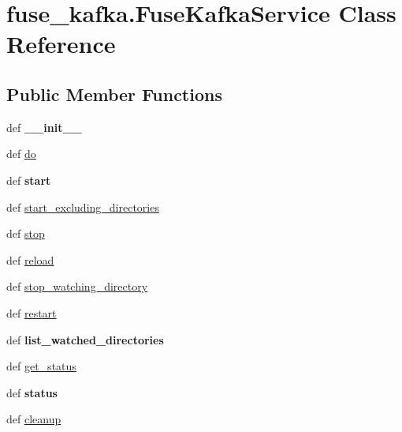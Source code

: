 \hypertarget{classfuse__kafka_1_1FuseKafkaService}{\section{fuse\-\_\-kafka.\-Fuse\-Kafka\-Service \-Class \-Reference}
\label{classfuse__kafka_1_1FuseKafkaService}
}
\subsection*{\-Public \-Member \-Functions}
\begin{DoxyCompactItemize}
\item 
\hypertarget{classfuse__kafka_1_1FuseKafkaService_a0bd77704cc258a800441426e62452195}{def {\bfseries \-\_\-\-\_\-init\-\_\-\-\_\-}}\label{classfuse__kafka_1_1FuseKafkaService_a0bd77704cc258a800441426e62452195}

\item 
def \hyperlink{classfuse__kafka_1_1FuseKafkaService_a08ccfab12ff2c998f5bc466de9c9afa4}{do}
\item 
\hypertarget{classfuse__kafka_1_1FuseKafkaService_a2d8e0d317d293fa8f932e3e8882549f5}{def {\bfseries start}}\label{classfuse__kafka_1_1FuseKafkaService_a2d8e0d317d293fa8f932e3e8882549f5}

\item 
def \hyperlink{classfuse__kafka_1_1FuseKafkaService_a8a8b5dd68c2c1dbd9315ac2ea4bd5219}{start\-\_\-excluding\-\_\-directories}
\item 
def \hyperlink{classfuse__kafka_1_1FuseKafkaService_ad17bb7d3209b7242defee5aa54ca828e}{stop}
\item 
def \hyperlink{classfuse__kafka_1_1FuseKafkaService_a1f122fd8f929a5d8e56d8d1bad9cc465}{reload}
\item 
def \hyperlink{classfuse__kafka_1_1FuseKafkaService_a6ea1d1193be9c118752f6b7a4c53df92}{stop\-\_\-watching\-\_\-directory}
\item 
def \hyperlink{classfuse__kafka_1_1FuseKafkaService_a7cc4774d8ed31ffe42ca2f955501ee45}{restart}
\item 
\hypertarget{classfuse__kafka_1_1FuseKafkaService_aa7dd2095cfc8b080fba7047654e92eb9}{def {\bfseries list\-\_\-watched\-\_\-directories}}\label{classfuse__kafka_1_1FuseKafkaService_aa7dd2095cfc8b080fba7047654e92eb9}

\item 
def \hyperlink{classfuse__kafka_1_1FuseKafkaService_a6e9278183d970e683d7060610bb9bc6f}{get\-\_\-status}
\item 
\hypertarget{classfuse__kafka_1_1FuseKafkaService_a0289d64b6f56aef8b710466042ada3d1}{def {\bfseries status}}\label{classfuse__kafka_1_1FuseKafkaService_a0289d64b6f56aef8b710466042ada3d1}

\item 
def \hyperlink{classfuse__kafka_1_1FuseKafkaService_a9cf98c6a35fb986e6877dfdca61630c0}{cleanup}
\end{DoxyCompactItemize}
